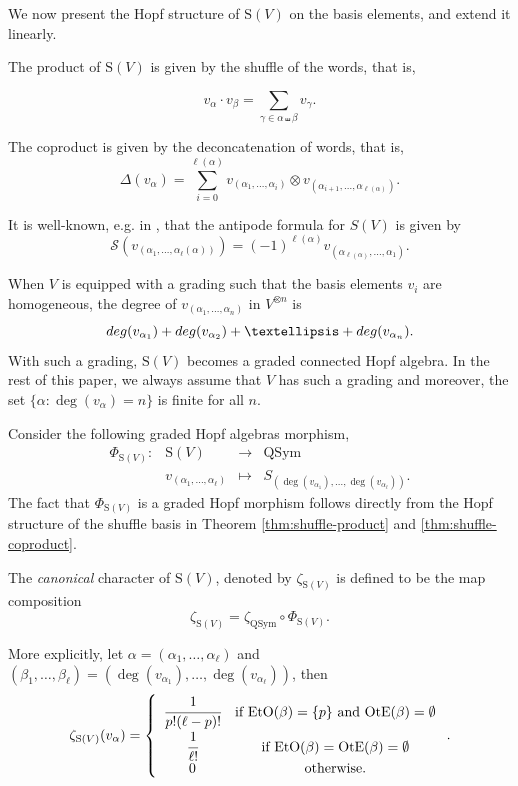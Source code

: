 \documentclass[12pt]{amsart}
\numberwithin{equation}{section}
\newcommand{\QSym}{\mathrm{QSym}}
\newcommand{\rmS}{\mathrm{S}}
\newcommand{\OtE}{\mathrm{OtE}}
\newcommand{\EtO}{\mathrm{EtO}}
\begin{document}
We now present the Hopf structure of $\rmS(V)$ on the basis elements, and extend it linearly.

The product of $\rmS(V)$ is given by the shuffle of the words, that is,

$$v_\alpha\cdot v_\beta=\sum_{\gamma\in\alpha\shuffle\beta}v_\gamma.$$

The coproduct is given by the deconcatenation of words, that is, 
$$\Delta(v_\alpha)=\sum_{i=0}^{\ell(\alpha)} v_{(\alpha_1,\dots,\alpha_i)}\otimes v_{(\alpha_{i+1},\dots,\alpha_{\ell(\alpha)})}.$$ 

It is well-known, e.g. in \cite{BS14}, that the antipode formula for $S(V)$ is given by
$$\mathcal{S}(v_{(\alpha_1,\dots,\alpha_\ell(\alpha))})=(-1)^{\ell(\alpha)}v_{(\alpha_{\ell(\alpha)},\dots,\alpha_1)}.$$

When $V$ is equipped with a grading such that the basis elements $v_i$ are homogeneous, the degree of $v_{(\alpha_1,\dots,\alpha_n)}$ in $V^{\otimes n}$ is 
$${\rm deg}(v_{\alpha_1})+{\rm deg}(v_{\alpha_2})+\dots+{\rm deg}(v_{\alpha_n}).$$
With such a grading, $\rmS(V)$ becomes a graded connected Hopf algebra. In the rest of this paper, we always assume that $V$ has such a grading and moreover, the set $\{\alpha:\deg(v_\alpha)=n\}$ is finite for all $n$.

Consider the following graded Hopf algebras morphism, $$\begin{array}{cccc}
	\Phi_{\rmS(V)}:&\rmS(V)&\rightarrow& \QSym\\
	&v_{(\alpha_1,\dots,\alpha_\ell)}& \mapsto & S_{(\deg(v_{\alpha_1}),\dots,\deg(v_{\alpha_\ell}))}.
\end{array}$$
The fact that $\Phi_{\rmS(V)}$ is a graded Hopf morphism follows directly from the Hopf structure of the shuffle basis in Theorem \ref{thm:shuffle-product} and \ref{thm:shuffle-coproduct}.

The \textit{canonical} character of $\rmS(V)$, denoted by $\zeta_{\rmS(V)}$ is defined to be the map composition
$$\zeta_{\rmS(V)}=\zeta_{\QSym}\circ\Phi_{\rmS(V)}.$$

More explicitly, let $\alpha=(\alpha_1,\dots,\alpha_\ell)$ and $(\beta_1,\dots,\beta_\ell)=(\deg(v_{\alpha_1}),\dots,\deg(v_{\alpha_\ell}))$, then
$$\zeta_{\rmS(V)}(v_\alpha)=\left\{\begin{array}{cc}
\cfrac{1}{p!(\ell-p)!} & \text{if }\EtO(\beta)=\{p\}\text{ and }\OtE(\beta)=\emptyset\\
\cfrac{1}{\ell!} & \text{if }\EtO(\beta)=\OtE(\beta)=\emptyset\\
0 & \text{otherwise}.
\end{array}\right..$$
\end{document}
